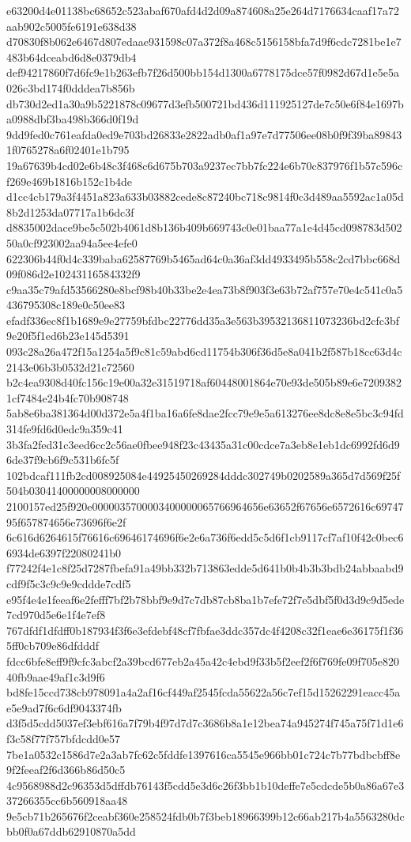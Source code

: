 {e63200d4e01138bc68652c523abaf670afd4d2d09a874608a25e264d7176634caaf17a72aab902c5005fe6191e638d38
d70830f8b062e6467d807edaae931598c07a372f8a468c5156158bfa7d9f6cdc7281be1e7483b64dceabd6d8e0379db4
def94217860f7d6fc9e1b263efb7f26d500bb154d1300a6778175dce57f0982d67d1e5e5a026c3bd174f0dddea7b856b
db730d2ed1a30a9b5221878c09677d3efb500721bd436d111925127de7c50e6f84e1697ba0988dbf3ba498b366d0f19d
9dd9fed0c761eafda0ed9e703bd26833e2822adb0af1a97e7d77506ee08b0f9f39ba898431f0765278a6f02401e1b795
19a67639b4cd02e6b48c3f468c6d675b703a9237ec7bb7fc224e6b70c837976f1b57c596cf269e469b1816b152c1b4de
d1cc4cb179a3f4451a823a633b03882cede8c87240bc718c9814f0c3d489aa5592ac1a05d8b2d1253da07717a1b6dc3f
d8835002dace9be5c502b4061d8b136b409b669743c0e01baa77a1e4d45cd098783d50250a0cf923002aa94a5ee4efe0
622306b44f0d4c339baba62587769b5465ad64c0a36af3dd4933495b558c2cd7bbc668d09f086d2e10243116584332f9
c9aa35c79afd53566280e8bcf98b40b33be2e4ea73b8f903f3e63b72af757e70e4c541c0a5436795308c189e0c50ee83
efadf336ec8f1b1689e9e27759bfdbc22776dd35a3e563b39532136811073236bd2cfc3bf9e20f5f1ed6b23e145d5391
093c28a26a472f15a1254a5f9c81c59abd6cd11754b306f36d5e8a041b2f587b18cc63d4c2143e06b3b0532d21c72560
b2c4ea9308d40fc156c19e00a32e31519718af60448001864e70e93de505b89e6e72093821cf7484e24b4fc70b908748
5ab8e6ba381364d00d372e5a4f1ba16a6fe8dae2fcc79e9e5a613276ee8dc8e8e5bc3c94fd314fe9fd6d0edc9a359c41
3b3fa2fed31c3eed6cc2c56ae0fbee948f23c43435a31c00cdce7a3eb8e1eb1dc6992fd6d96de37f9cb6f9c531b6fc5f
102bdcaf111fb2cd008925084e44925450269284dddc302749b0202589a365d7d569f25f504b03041400000008000000
2100157ed25f920e0000035700003400000065766964656e63652f67656e6572616c6974795f657874656e73696f6e2f
6c616d6264615f76616c69646174696f6e2e6a736f6edd5c5d6f1cb9117cf7af10f42c0bec66934de6397f22080241b0
f77242f4e1c8f25d7287fbefa91a49bb332b713863edde5d641b0b4b3b3bdb24abbaabd9cdf9f5c3c9c9e9cddde7cdf5
e95f4e4e1feeaf6e2fefff7bf2b78bbf9e9d7c7db87cb8ba1b7efe72f7e5dbf5f0d3d9c9d5ede7cd970d5e6e1f4e7ef8
767dfdf1dfdff0b187934f3f6e3efdebf48cf7fbfae3ddc357dc4f4208c32f1eae6e36175f1f365ff0cb709e86dfdddf
fdcc6bfe8eff9f9cfc3abcf2a39bcd677eb2a45a42c4ebd9f33b5f2eef2f6f769fe09f705e82040fb9aae49af1c3d9f6
bd8fe15ccd738cb978091a4a2af16cf449af2545fcda55622a56c7ef15d15262291eacc45ae5e9ad7f6c6df9043374fb
d3f5d5cdd5037ef3ebf616a7f79b4f97d7d7c3686b8a1e12bea74a945274f745a75f71d1e6f3c58f77f757bfdcdd0e57
7be1a0532c1586d7e2a3ab7fc62c5fddfe1397616ca5545e966bb01c724c7b77bdbcbff8e9f2feeaf2f6d366b86d50c5
4c9568988d2c96353d5dffdb76143f5cdd5e3d6c26f3bb1b10deffe7e5cdcde5b0a86a67e337266355cc6b560918aa48
9e5cb71b265676f2ceabf360e258524fdb0b7f3beb18966399b12c66ab217b4a5563280dcbb0f0a67ddb62910870a5dd
}
